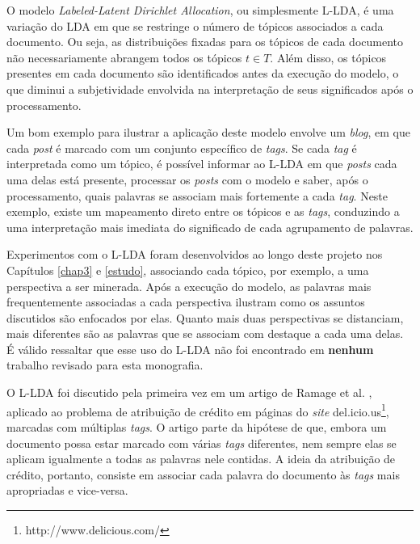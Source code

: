 O modelo \emph{Labeled-Latent Dirichlet Allocation}, ou simplesmente L-LDA, é uma variação do LDA em que se restringe o número de tópicos associados a cada documento. Ou seja, as distribuições fixadas para os tópicos de cada documento não necessariamente abrangem todos os tópicos \ensuremath{t \in T}. Além disso, os tópicos presentes em cada documento são identificados antes da execução do modelo, o que diminui a subjetividade envolvida na interpretação de seus significados após o processamento. 

Um bom exemplo para ilustrar a aplicação deste modelo envolve um \emph{blog}, em que cada \emph{post} é marcado com um conjunto específico de \emph{tags}. Se cada \emph{tag} é interpretada como um tópico, é possível informar ao L-LDA em que \emph{posts} cada uma delas está presente, processar os \emph{posts} com o modelo e saber, após o processamento, quais palavras se associam mais fortemente a cada \emph{tag}. Neste exemplo, existe um mapeamento direto entre os tópicos e as \emph{tags}, conduzindo a uma interpretação mais imediata do significado de cada agrupamento de palavras.

Experimentos com o L-LDA foram desenvolvidos ao longo deste projeto nos Capítulos \ref{chap3} e \ref{estudo}, associando cada tópico, por exemplo, a uma perspectiva a ser minerada. Após a execução do modelo, as palavras mais frequentemente associadas a cada perspectiva ilustram como os assuntos discutidos são enfocados por elas. Quanto mais duas perspectivas se distanciam, mais diferentes são as palavras que se associam com destaque a cada uma delas. É válido ressaltar que esse uso do L-LDA não foi encontrado em \textbf{nenhum} trabalho revisado para esta monografia.

O L-LDA foi discutido pela primeira vez em um artigo de Ramage et al. \cite{llda}, aplicado ao problema de atribuição de crédito em páginas do \emph{site} del.icio.us\footnote{http://www.delicious.com/}, marcadas com múltiplas \emph{tags}. O artigo parte da hipótese de que, embora um documento possa estar marcado com várias \emph{tags} diferentes, nem sempre elas se aplicam igualmente a todas as palavras nele contidas. A ideia da atribuição de crédito, portanto, consiste em associar cada palavra do documento às \emph{tags} mais apropriadas e vice-versa. 


